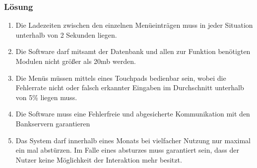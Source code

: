 \documentclass[11pt]{article}
\begin{document}
\subsubsection{Lösung}
\label{sec-2-4-1}

\begin{enumerate}
\item Die Ladezeiten zwischen den einzelnen Menüeinträgen muss in jeder Situation unterhalb von 2 Sekunden liegen.
\item Die Software darf mitsamt der Datenbank und allen zur Funktion benötigten Modulen nicht größer als 20mb werden.
\item Die Menüs müssen mittels eines Touchpads bedienbar sein, wobei die Fehlerrate nicht oder falsch erkannter
    Eingaben im Durchschnitt unterhalb von 5\% liegen muss.
\item Die Software muss eine Fehlerfreie und abgesicherte Kommunikation mit den Bankservern garantieren
\item Das System darf innerhalb eines Monats bei vielfacher Nutzung nur maximal ein mal abstürzen. Im Falle eines
   absturzes muss garantiert sein, dass der Nutzer keine Möglichkeit der Interaktion mehr besitzt.
\end{enumerate}
\end{document}
